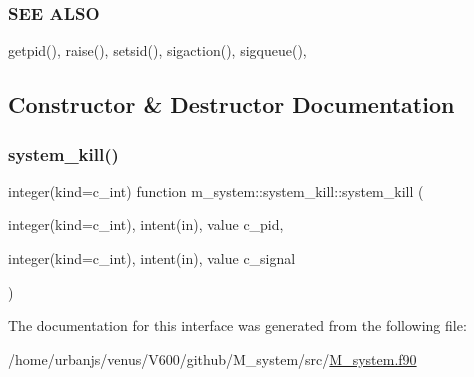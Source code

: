 \subsubsection*{S\+EE A\+L\+SO}

getpid(), raise(), setsid(), sigaction(), sigqueue(), 

\subsection{Constructor \& Destructor Documentation}
\mbox{\label{interfacem__system_1_1system__kill_a79ff46722f540f931d947f90bdf2c8ea}} 
\subsubsection{\texorpdfstring{system\+\_\+kill()}{system\_kill()}}
{\footnotesize\ttfamily integer(kind=c\+\_\+int) function m\+\_\+system\+::system\+\_\+kill\+::system\+\_\+kill (\begin{DoxyParamCaption}\item[{integer(kind=c\+\_\+int), intent(in), value}]{c\+\_\+pid,  }\item[{integer(kind=c\+\_\+int), intent(in), value}]{c\+\_\+signal }\end{DoxyParamCaption})\hspace{0.3cm}{\ttfamily [private]}}



The documentation for this interface was generated from the following file\+:\begin{DoxyCompactItemize}
\item 
/home/urbanjs/venus/\+V600/github/\+M\+\_\+system/src/\mbox{\hyperlink{M__system_8f90}{M\+\_\+system.\+f90}}\end{DoxyCompactItemize}
